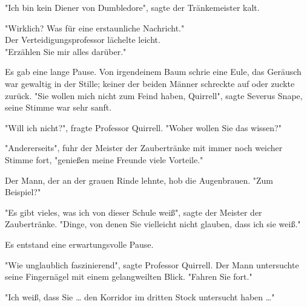 {"Ich bin kein Diener von Dumbledore", sagte der Tränkemeister kalt.

"Wirklich? Was für eine erstaunliche Nachricht."\\ Der Verteidigungsprofessor lächelte leicht.\\ "Erzählen Sie mir alles darüber."

Es gab eine lange Pause. Von irgendeinem Baum schrie eine Eule, das Geräusch war gewaltig in der Stille; keiner der beiden Männer schreckte auf oder zuckte zurück. "Sie wollen mich nicht zum Feind haben, Quirrell", sagte Severus Snape, seine Stimme war sehr sanft.

"Will ich nicht?", fragte Professor Quirrell. "Woher wollen Sie das wissen?"

"Andererseits", fuhr der Meister der Zaubertränke mit immer noch weicher Stimme fort, "genießen meine Freunde viele Vorteile."

Der Mann, der an der grauen Rinde lehnte, hob die Augenbrauen. "Zum Beispiel?"

"Es gibt vieles, was ich von dieser Schule weiß", sagte der Meister der Zaubertränke. "Dinge, von denen Sie vielleicht nicht glauben, dass ich sie weiß."

Es entstand eine erwartungsvolle Pause.

"Wie unglaublich faszinierend", sagte Professor Quirrell. Der Mann untersuchte seine Fingernägel mit einem gelangweilten Blick. "Fahren Sie fort."

"Ich weiß, dass Sie … den Korridor im dritten Stock untersucht haben …"

}

